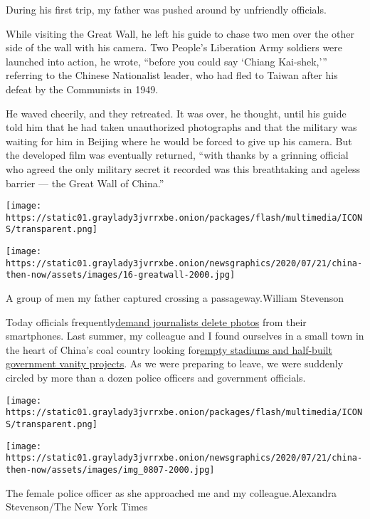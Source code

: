 During his first trip, my father was pushed around by unfriendly
officials.

While visiting the Great Wall, he left his guide to chase two men over
the other side of the wall with his camera. Two People's Liberation Army
soldiers were launched into action, he wrote, ``before you could say
`Chiang Kai-shek,''' referring to the Chinese Nationalist leader, who
had fled to Taiwan after his defeat by the Communists in 1949.

He waved cheerily, and they retreated. It was over, he thought, until
his guide told him that he had taken unauthorized photographs and that
the military was waiting for him in Beijing where he would be forced to
give up his camera. But the developed film was eventually returned,
``with thanks by a grinning official who agreed the only military secret
it recorded was this breathtaking and ageless barrier --- the Great Wall
of China.''

\texttt{[image: https://static01.graylady3jvrrxbe.onion/packages/flash/multimedia/ICONS/transparent.png]}

\texttt{[image: https://static01.graylady3jvrrxbe.onion/newsgraphics/2020/07/21/china-then-now/assets/images/16-greatwall-2000.jpg]}

A group of men my father captured crossing a passageway.William
Stevenson

Today officials
frequently\href{https://www.nytimes3xbfgragh.onion/2019/02/27/technology/personaltech/digital-footprint-surveillance.html}{}\href{https://www.nytimes3xbfgragh.onion/2019/02/27/technology/personaltech/digital-footprint-surveillance.html}{demand
journalists delete photos} from their smartphones. Last summer, my
colleague and I found ourselves in a small town in the heart of China's
coal country looking
for\href{https://www.nytimes3xbfgragh.onion/2019/11/10/business/china-debt-hospitals.html}{}\href{https://www.nytimes3xbfgragh.onion/2019/11/10/business/china-debt-hospitals.html}{empty
stadiums and half-built government vanity projects}. As we were
preparing to leave, we were suddenly circled by more than a dozen police
officers and government officials.

\texttt{[image: https://static01.graylady3jvrrxbe.onion/packages/flash/multimedia/ICONS/transparent.png]}

\texttt{[image: https://static01.graylady3jvrrxbe.onion/newsgraphics/2020/07/21/china-then-now/assets/images/img\_0807-2000.jpg]}

The female police officer as she approached me and my
colleague.Alexandra Stevenson/The New York Times

